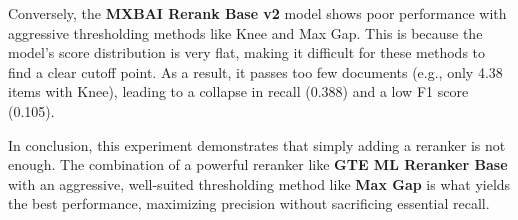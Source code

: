 Conversely, the \textbf{MXBAI Rerank Base v2} model shows poor performance with aggressive thresholding methods like Knee and Max Gap. This is because the model's score distribution is very flat, making it difficult for these methods to find a clear cutoff point. As a result, it passes too few documents (e.g., only 4.38 items with Knee), leading to a collapse in recall (0.388) and a low F1 score (0.105).

In conclusion, this experiment demonstrates that simply adding a reranker is not enough. The combination of a powerful reranker like \textbf{GTE ML Reranker Base} with an aggressive, well-suited thresholding method like \textbf{Max Gap} is what yields the best performance, maximizing precision without sacrificing essential recall.


